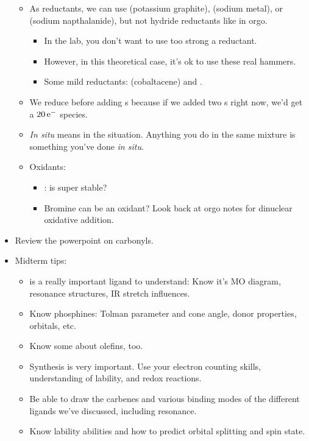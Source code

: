 \documentclass[../notes.tex]{subfiles}
\begin{document}
\begin{itemize}
\begin{itemize}
        \item As reductants, we can use  (potassium graphite),  (sodium metal), or  (sodium napthalanide), but not hydride reductants like in orgo.
        \begin{itemize}
            \item In the lab, you don't want to use too strong a reductant.
            \item However, in this theoretical case, it's ok to use these real hammers.
            \item Some mild reductants:  (cobaltacene) and .
        \end{itemize}
        \item We reduce before adding s because if we added two s right now, we'd get a $20\,\e[-]$ species.
        \item \emph{In situ} means in the situation. Anything you do in the same mixture is something you've done \emph{in situ}.
        \item Oxidants:
        \begin{itemize}
            \item {}:  is super stable?
            \item Bromine can be an oxidant? Look back at orgo notes for dinuclear oxidative addition.
        \end{itemize}
    \end{itemize}
    \item Review the powerpoint on carbonyls.
    \item Midterm tips:
    \begin{itemize}
        \item {} is a really important ligand to understand: Know it's MO diagram, resonance structures, IR stretch influences.
        \item Know phosphines: Tolman parameter and cone angle, donor properties, orbitals, etc.
        \item Know some about olefins, too.
        \item Synthesis is very important. Use your electron counting skills, understanding of lability, and redox reactions.
        \item Be able to draw the carbenes and various binding modes of the different ligands we've discussed, including resonance.
        \item Know lability abilities and how to predict orbital splitting and spin state.

\end{itemize}
\end{itemize}
\end{document}
